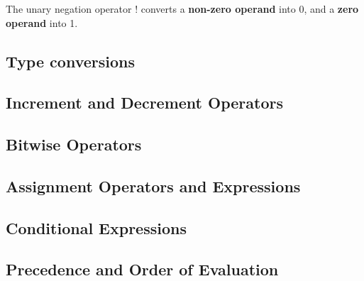 \documentclass{article}
\begin{document}
The unary negation operator ! converts a \textbf{non-zero operand} into 0, and a \textbf{zero operand} into 1.

\subsection{Type conversions}

\subsection{Increment and Decrement Operators}

\subsection{Bitwise Operators}

\subsection{Assignment Operators and Expressions}

\subsection{Conditional Expressions}

\subsection{Precedence and Order of Evaluation}
\end{document}
